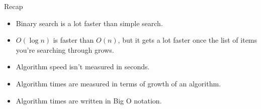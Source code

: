 \documentclass[ignorenonframetext,]{beamer}
\providecommand{\tightlist}{%
  \setlength{\itemsep}{0pt}\setlength{\parskip}{0pt}}
\begin{document}
\begin{frame}{Recap}
\protect\hypertarget{recap}{}

\begin{itemize}
\tightlist
\item
  Binary search is a lot faster than simple search.
\item
  \(O(\log n)\) is faster than \(O(n)\), but it gets a lot faster once
  the list of items you're searching through grows.
\item
  Algorithm speed isn't measured in seconds.
\item
  Algorithm times are measured in terms of growth of an algorithm.
\item
  Algorithm times are written in Big O notation.
\end{itemize}

\end{frame}
\end{document}
